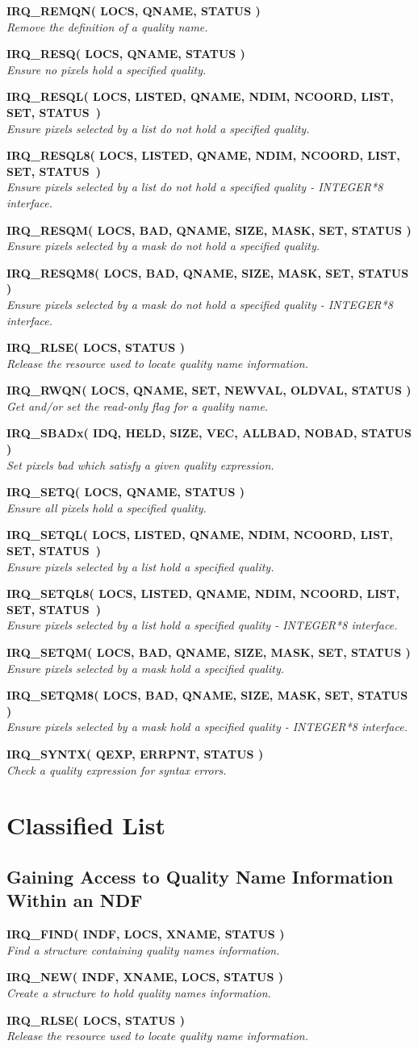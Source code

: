 \documentclass[twoside,11pt,nolof]{starlink}
\providecommand{\noteroutine}[2]{\textbf{#1}\hspace*{\fill}\nopagebreak \\
                             \hspace*{3em}\emph{#2}\hspace*{\fill}\par}
\begin{document}
\noteroutine{IRQ\_REMQN( LOCS, QNAME, STATUS )}
   {Remove the definition of a quality name.}
\noteroutine{IRQ\_RESQ( LOCS, QNAME, STATUS )}
   {Ensure no pixels hold a specified quality.}
\noteroutine{IRQ\_RESQL( LOCS, LISTED, QNAME, NDIM, NCOORD, LIST, SET, STATUS~)}
   {Ensure pixels selected by a list do not hold a specified quality.}
\noteroutine{IRQ\_RESQL8( LOCS, LISTED, QNAME, NDIM, NCOORD, LIST, SET, STATUS~)}
   {Ensure pixels selected by a list do not hold a specified quality - INTEGER*8 interface.}
\noteroutine{IRQ\_RESQM( LOCS, BAD, QNAME, SIZE, MASK, SET, STATUS )}
   {Ensure pixels selected by a mask do not hold a specified quality.}
\noteroutine{IRQ\_RESQM8( LOCS, BAD, QNAME, SIZE, MASK, SET, STATUS )}
   {Ensure pixels selected by a mask do not hold a specified quality - INTEGER*8 interface.}
\noteroutine{IRQ\_RLSE( LOCS, STATUS )}
   {Release the resource used to locate quality name information.}
\noteroutine{IRQ\_RWQN( LOCS, QNAME, SET, NEWVAL, OLDVAL, STATUS )}
   {Get and/or set the read-only flag for a quality name.}
\noteroutine{IRQ\_SBADx( IDQ, HELD, SIZE, VEC, ALLBAD, NOBAD, STATUS )}
   {Set pixels bad which satisfy a given quality expression.}
\noteroutine{IRQ\_SETQ( LOCS, QNAME, STATUS )}
   {Ensure all pixels hold a specified quality.}
\noteroutine{IRQ\_SETQL( LOCS, LISTED, QNAME, NDIM, NCOORD, LIST, SET, STATUS~)}
   {Ensure pixels selected by a list hold a specified quality.}
\noteroutine{IRQ\_SETQL8( LOCS, LISTED, QNAME, NDIM, NCOORD, LIST, SET, STATUS~)}
   {Ensure pixels selected by a list hold a specified quality - INTEGER*8 interface.}
\noteroutine{IRQ\_SETQM( LOCS, BAD, QNAME, SIZE, MASK, SET, STATUS )}
   {Ensure pixels selected by a mask hold a specified quality.}
\noteroutine{IRQ\_SETQM8( LOCS, BAD, QNAME, SIZE, MASK, SET, STATUS )}
   {Ensure pixels selected by a mask hold a specified quality - INTEGER*8 interface.}
\noteroutine{IRQ\_SYNTX( QEXP, ERRPNT, STATUS )}
   {Check a quality expression for syntax errors.}

\newpage
\section {Classified List}

\subsection{Gaining Access to Quality Name Information Within an NDF}
\noteroutine{IRQ\_FIND( INDF, LOCS, XNAME, STATUS )}
   {Find a structure containing quality names information.}
\noteroutine{IRQ\_NEW( INDF, XNAME, LOCS, STATUS )}
   {Create a structure to hold quality names information.}
\noteroutine{IRQ\_RLSE( LOCS, STATUS )}
   {Release the resource used to locate quality name information.}
\end{document}
